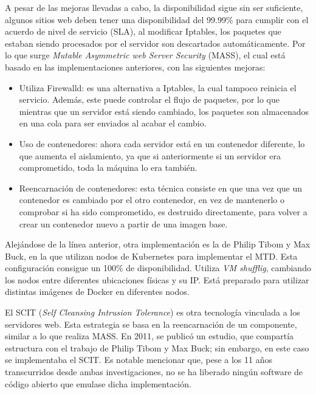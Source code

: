 A pesar de las mejoras llevadas a cabo, la disponibilidad sigue sin ser suficiente, algunos sitios web deben tener una disponibilidad del 99.99\% para cumplir con el acuerdo de nivel de servicio (SLA)\cite{SLA}, al modificar Iptables, los paquetes que estaban siendo procesados por el servidor son descartados automáticamente. Por lo que surge \textit{Mutable Asymmetric web Server Security} (MASS), el cual está basado en las implementaciones anteriores, con las siguientes mejoras:
\begin{itemize}
    \item Utiliza Firewalld\cite{firewalld}: es una alternativa a Iptables, la cual tampoco reinicia el servicio. Además, este puede controlar el flujo de paquetes, por lo que mientras que un servidor está siendo cambiado, los paquetes son almacenados en una cola para ser enviados al acabar el cambio.
    \item Uso de contenedores: ahora cada servidor está en un contenedor diferente, lo que aumenta el aislamiento, ya que si anteriormente si un servidor era comprometido, toda la máquina lo era también.
    \item Reencarnación de contenedores: esta técnica consiste en que una vez que un contenedor es cambiado por el otro contenedor, en vez de mantenerlo o comprobar si ha sido comprometido, es destruido directamente, para volver a crear un contenedor nuevo a partir de una imagen base.
\end{itemize}

Alejándose de la línea anterior, otra implementación es la de Philip Tibom y Max Buck\cite{MTD-gotemburgo}, en la que utilizan nodos de Kubernetes\cite{kubernetes} para implementar el MTD. Esta configuración consigue un 100\% de disponibilidad. Utiliza \textit{VM shufflig}, cambiando los nodos entre diferentes ubicaciones físicas y su IP. Está preparado para utilizar distintas imágenes de Docker en diferentes nodos.

El SCIT (\textit{Self Cleansing Intrusion Tolerance})\cite{SCIT-base} es otra tecnología vinculada a los servidores web. Esta estrategia se basa en la reencarnación de un componente, similar a lo que realiza MASS. En 2011, se publicó un estudio\cite{SCIT-cloud}, que compartía estructura con el trabajo de Philip Tibom y Max Buck; sin embargo, en este caso se implementaba el SCIT. Es notable mencionar que, pese a los 11 años transcurridos desde ambas investigaciones, no se ha liberado ningún software de código abierto que emulase dicha implementación.


